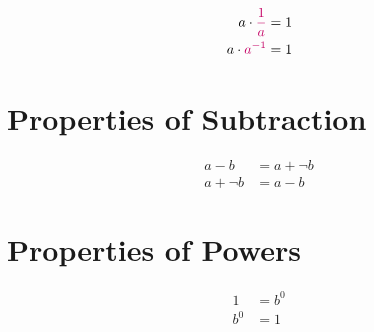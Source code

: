 \documentclass[20150903-160354-rs2.2-MarksMathNotebook.tex]{subfiles}
\begin{document}
\begin{property}
\begin{subequations}
\begin{align}
a \cdot \alert{\dfrac{1}{a}} &= 1 \label{eq:mi1} \\
a \cdot \alert{a^{-1}} &= 1 \label{eq:mi2}
\end{align}
\end{subequations}
\end{property}


\section{Properties of Subtraction}

\begin{definition}
\begin{subequations}
\begin{align}
a-b &= a+\neg b \label{eq:dos1} \\
a+\neg b &= a-b \label{eq:dos2}
\end{align}
\end{subequations}
\end{definition}

\section{Properties of Powers}


\begin{property}
\begin{subequations}
\begin{align}
1&= b^0  \label{eq:poid1} \\
b^{0}&= 1  \label{eq:poid2}
\end{align}
\end{subequations}
\end{property}


\end{document}
